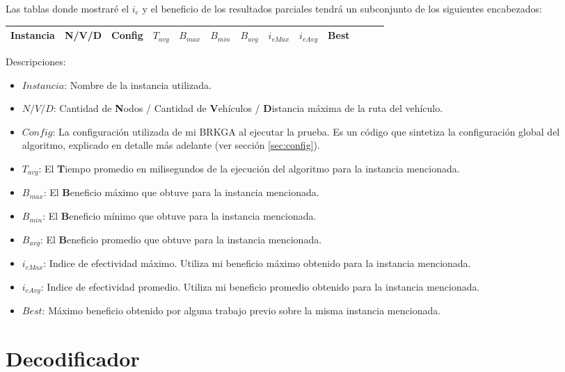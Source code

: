 \bigskip

Las tablas donde mostraré el $i_e$ y el beneficio de los resultados parciales tendrá un subconjunto de los siguientes encabezados:

\begin{center}
\begin{tabular}{ |c|c|c|c|c|c|c|c|c|c|c|c|c| } 
 \hline
Instancia & N/V/D & Config & $T_{avg}$ & $B_{max}$ & $B_{min}$ & $B_{avg}$ & $i_{eMax}$ & $i_{eAvg}$ & Best \\
\hline
\end{tabular}
\end{center}

\bigskip

Descripciones:
\begin{itemize}
	\item \textbf{$Instancia$}: Nombre de la instancia utilizada.
	\item \textbf{$N/V/D$}: Cantidad de \textbf{N}odos / Cantidad de \textbf{V}ehículos / \textbf{D}istancia máxima de la ruta del vehículo.
	\item \textbf{$Config$}: La configuración utilizada de mi BRKGA al ejecutar la prueba. Es un código que sintetiza la configuración global del algoritmo, explicado en detalle más adelante (ver sección \ref{sec:config}).
	\item \textbf{$T_{avg}$}: El \textbf{T}iempo promedio en milisegundos de la ejecución del algoritmo para la instancia mencionada.
	\item \textbf{$B_{max}$}: El \textbf{B}eneficio máximo que obtuve para la instancia mencionada.
	\item \textbf{$B_{min}$}: El \textbf{B}eneficio mínimo que obtuve para la instancia mencionada.
	\item \textbf{$B_{avg}$}: El \textbf{B}eneficio promedio que obtuve para la instancia mencionada.
	\item \textbf{$i_{eMax}$}: Indice de efectividad máximo. Utiliza mi beneficio máximo obtenido para la instancia mencionada.
	\item \textbf{$i_{eAvg}$}: Indice de efectividad promedio. Utiliza mi beneficio promedio obtenido para la instancia mencionada.
	\item \textbf{$Best$}: Máximo beneficio obtenido por alguna trabajo previo sobre la misma instancia mencionada.
\end{itemize}

\section{Decodificador}

